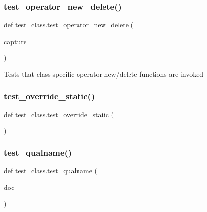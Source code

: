 \mbox{\label{namespacetest__class_a5aa0b7714fa04082b305b40aca08d29f}} 
\subsubsection{\texorpdfstring{test\_operator\_new\_delete()}{test\_operator\_new\_delete()}}
{\footnotesize\ttfamily def test\+\_\+class.\+test\+\_\+operator\+\_\+new\+\_\+delete (\begin{DoxyParamCaption}\item[{}]{capture }\end{DoxyParamCaption})}

\begin{DoxyVerb}Tests that class-specific operator new/delete functions are invoked\end{DoxyVerb}
 \mbox{\label{namespacetest__class_a8335b78a7a5a1b496f2eaea9f8cf1336}} 
\subsubsection{\texorpdfstring{test\_override\_static()}{test\_override\_static()}}
{\footnotesize\ttfamily def test\+\_\+class.\+test\+\_\+override\+\_\+static (\begin{DoxyParamCaption}{ }\end{DoxyParamCaption})}

 \mbox{\label{namespacetest__class_ac1d9069399bd0db4b0caed7fd883e025}} 
\subsubsection{\texorpdfstring{test\_qualname()}{test\_qualname()}}
{\footnotesize\ttfamily def test\+\_\+class.\+test\+\_\+qualname (\begin{DoxyParamCaption}\item[{}]{doc }\end{DoxyParamCaption})}

